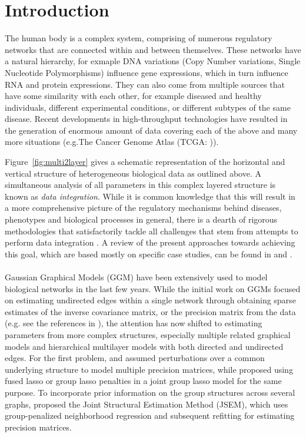 \section{Introduction}
The human body is a complex system, comprising of numerous regulatory networks that are connected within and between themselves. These networks have a natural hierarchy, for exmaple DNA variations (Copy Number variations, Single Nucleotide Polymorphisms) influence gene expressions, which in turn influence RNA and protein expressions. They can also come from multiple sources that have some similarity with each other, for example diseased and healthy individuals, different experimental conditions, or different subtypes of the same disease. Recent developments in high-throughput technologies have resulted in the generation of enormous amount of data covering each of the above and many more situations (e.g.The Cancer Genome Atlas (TCGA: \cite{Tomczak15})).

Figure~\ref{fig:multi2layer} gives a schematic representation of the horizontal and vertical structure of heterogeneous biological data as outlined above. A simultaneous analysis of all parameters in this complex layered structure is known as {\it data integration}. While it is common knowledge that this will result in a more comprehensive picture of the regulatory mechanisms behind diseases, phenotypes and biological processes in general, there is a dearth of rigorous methodologies that satisfactorily tackle all challenges that stem from attempts to perform data integration \citep{GomezCabreroEtal14,JoycePalsson06,GligPrzulj15}. A review of the present approaches towards achieving this goal, which are based mostly on specific case studies, can be found in \cite{GligPrzulj15} and \cite{ZhangOuyangZhao17}.

\paragraph{}
Gaussian Graphical Models (GGM) have been extensively used to model biological networks in the last few years. While the initial work on GGMs focused on estimating undirected edges within a single network through obtaining sparse estimates of the inverse covariance matrix, or the precision matrix from the data (e.g. see the references in \cite{BuhlmannvandeGeer11}), the attention has now shifted to estimating parameters from more complex structures, especially multiple related graphical models and hierarchical multilayer models with both directed and undirected edges. For the first problem, \cite{GuoEtal11} and \cite{XieLiuValdar16} assumed perturbations over a common underlying structure to model multiple precision matrices, while \cite{DanaherEtal14} proposed using fused lasso or group lasso penalties in a joint group lasso model for the same purpose. To incorporate prior information on the group structures across several graphs, \cite{MaMichailidis15} proposed the Joint Structural Estimation Method (JSEM), which uses group-penalized neighborhood regression and subsequent refitting for estimating precision matrices.

